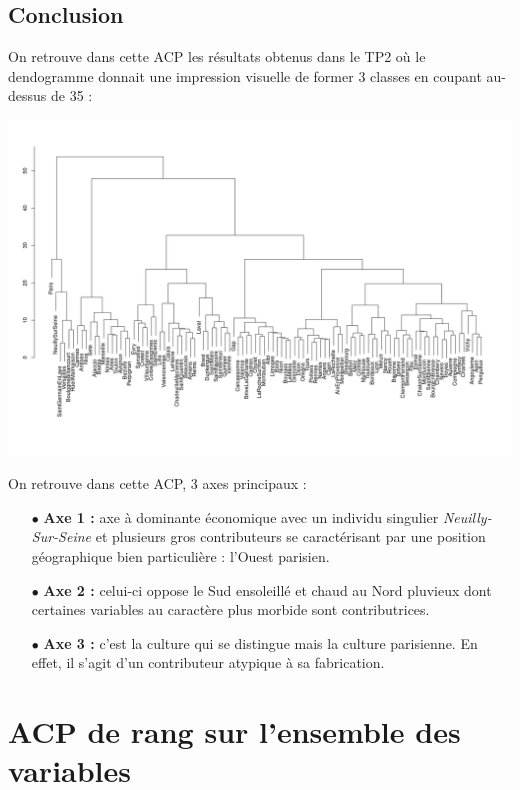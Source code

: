\documentclass{article}
\begin{document}
\newpage

\subsection{Conclusion}

On retrouve dans cette ACP les résultats obtenus dans le TP2 où le dendogramme donnait une impression visuelle de former 3 classes en coupant au-dessus de 35 :  

\centerline{\includegraphics[width=\linewidth]{images/Dendo}} 

On retrouve dans cette ACP, 3 axes principaux : 
\begin{itemize}
\item[$\bullet$] \textbf{Axe 1 :} axe à dominante économique avec un individu singulier \emph{Neuilly-Sur-Seine} et plusieurs gros contributeurs se caractérisant par une position géographique bien particulière : l'Ouest parisien. 
\item[$\bullet$]  \textbf{Axe 2 :} celui-ci oppose le Sud ensoleillé et chaud au Nord pluvieux dont certaines variables au caractère plus morbide sont contributrices. 
\item[$\bullet$] \textbf{Axe 3 :} c'est la culture qui se distingue mais la culture parisienne. En effet, il s'agit d'un contributeur atypique à sa fabrication.  
\end{itemize}

\newpage

\section{ACP de rang sur l'ensemble des variables}
\end{document}
